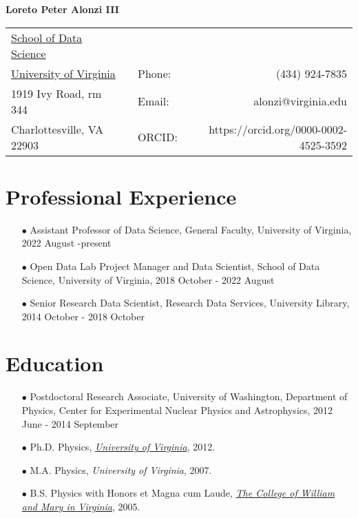 \documentclass{article}[10pt]
\begin{document}
\begin{center}
{\LARGE \textbf{Loreto Peter Alonzi III} }

\vspace{0.5cm}

\begin{tabular}{lclr}
\hline
\hline
\href{https://datascience.virginia.edu/}{School of Data Science}         & \qquad \qquad &  &         \\
\href{virginia.edu}{University of Virginia}        & \qquad \qquad &Phone: &   (434) 924-7835      \\
1919 Ivy Road, rm 344              & \qquad \qquad & Email: & alonzi@virginia.edu \\
Charlottesville, VA 22903& \qquad \qquad &  ORCID:      &    https://orcid.org/0000-0002-4525-3592                 \\
\hline
\hline
\end{tabular}
\end{center}


\section*{Professional Experience}
\begin{itemize}
\item [$\bullet$] Assistant Professor of Data Science, General Faculty, University of Virginia, 2022 August -present
\item [$\bullet$] Open Data Lab Project Manager and Data Scientist, School of Data Science, University of Virginia, 2018 October - 2022 August
\item [$\bullet$] Senior Research Data Scientist, Research Data Services, University Library, 2014 October - 2018 October
\end{itemize}


\section*{Education}
\begin{itemize}
\item [$\bullet$] Postdoctoral Research Associate, University of Washington, Department of Physics, Center for Experimental Nuclear Physics and Astrophysics, 2012 June - 2014 September
\item [$\bullet$] Ph.D. Physics, \href{http://www.phys.virginia.edu/}{\emph{University of Virginia}}, 2012.
\item [$\bullet$] M.A. Physics, \emph{University of Virginia}, 2007.
\item [$\bullet$] B.S. Physics with Honors et Magna cum Laude, \href{http://www.wm.edu/}{\emph{The College of William and Mary in Virginia}}, 2005.
\end{itemize}
\end{document}
